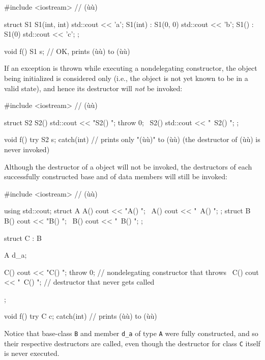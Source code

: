 \begin{emcppslisting}
#include <iostream>  // (ù{}ù)

struct S1
{
    S1(int, int)            { std::cout << 'a'; }
    S1(int)      : S1(0, 0) { std::cout << 'b'; }
    S1()         : S1(0)    { std::cout << 'c'; }
};

void f()
{
    S1 s;  // OK, prints (ù{}ù) to (ù{}ù)
}
\end{emcppslisting}

\noindent If an exception is thrown while executing a nondelegating constructor,
the object being initialized is considered only  (i.e., the object is not yet known to be in a valid state),
and hence its destructor will \emph{not} be
invoked:

\begin{emcppslisting}
#include <iostream>  // (ù{}ù)

struct S2
{
    S2()  { std::cout << "S2() ";  throw 0; }
    ~S2() { std::cout << "~S2() ";          }
};

void f() try { S2 s; } catch(int) { }
    // prints only "(ù{}ù)" to (ù{}ù) (the destructor of (ù{}ù) is never invoked)
\end{emcppslisting}

\noindent Although the destructor of a  object will not be invoked, the destructors of
each successfully constructed base and of data members will still be
invoked:

\begin{emcppslisting}
#include <iostream>  // (ù{}ù)

using std::cout;
struct A { A() { cout << "A() "; } ~A() { cout << "~A() "; } };
struct B { B() { cout << "B() "; } ~B() { cout << "~B() "; } };

struct C : B
{
    A d_a;

    C()  { cout << "C() "; throw 0; }  // nondelegating constructor that throws
    ~C() { cout << "~C() ";         }  // destructor that never gets called
};

void f() try { C c; } catch(int) { }
    // prints (ù{}ù) to (ù{}ù)
\end{emcppslisting}

\noindent Notice that base-class \lstinline!B! and member \lstinline!d_a! of type
\lstinline!A! were fully constructed, and so their respective destructors
are called, even though the destructor for class \lstinline!C! itself is
  never \mbox{executed}.

